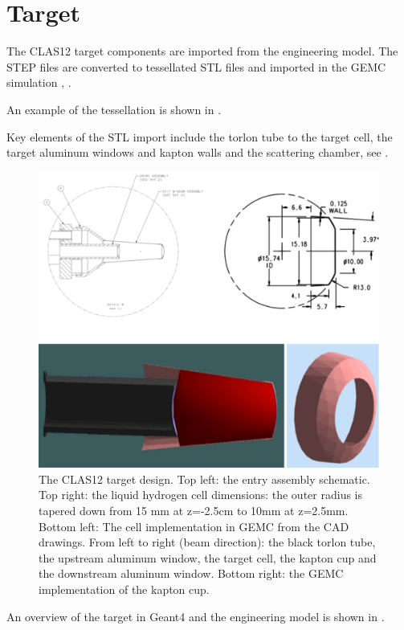 \section{Target}

The CLAS12 target components are imported from the engineering model. The STEP files are converted to tessellated STL files and imported
in the GEMC simulation \cite{targetCorrection}, \cite{targetStudy}.

An example of the tessellation is shown in .


Key elements of the STL import include the torlon tube to the target cell,
the target aluminum windows and kapton walls and the scattering chamber, see .

\begin{figure}
	\centering
	\includegraphics[width=0.95\columnwidth,keepaspectratio]{img/targetDesign.png}
	\caption{The CLAS12 target design. Top left: the entry assembly schematic. Top right: the liquid hydrogen cell
            dimensions: the outer radius is tapered down from 15 mm at z=-2.5cm to 10mm at z=2.5mm.
            Bottom left: The cell implementation in GEMC from the CAD drawings. From left to right (beam direction):
            the black torlon tube, the upstream aluminum window, the target cell, the kapton cup and the
				downstream aluminum window. Bottom right: the GEMC implementation of the kapton cup.}
	\label{fig:targetDesign}
\end{figure}

An overview of the target in Geant4 and the engineering model is shown in .

